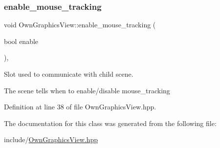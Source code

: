 \subsubsection{\texorpdfstring{enable\+\_\+mouse\+\_\+tracking}{enable\_mouse\_tracking}}
{\footnotesize\ttfamily void Own\+Graphics\+View\+::enable\+\_\+mouse\+\_\+tracking (\begin{DoxyParamCaption}\item[{bool}]{enable }\end{DoxyParamCaption})\hspace{0.3cm}{\ttfamily [inline]}, {\ttfamily [slot]}}



Slot used to communicate with child scene. 

The scene tells when to enable/disable mouse\+\_\+tracking 

Definition at line 38 of file Own\+Graphics\+View.\+hpp.



The documentation for this class was generated from the following file\+:\begin{DoxyCompactItemize}
\item 
include/\mbox{\hyperlink{OwnGraphicsView_8hpp}{Own\+Graphics\+View.\+hpp}}\end{DoxyCompactItemize}
